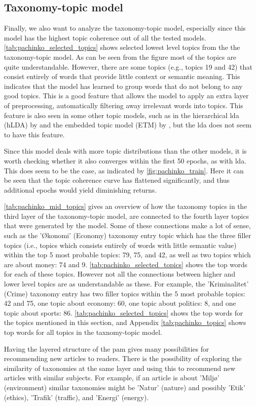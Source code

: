 \subsection{Taxonomy-topic model}\label{sec:taxonomy_analysis}
Finally, we also want to analyze the taxonomy-topic model, especially since this model has the highest topic coherence out of all the tested models.
\autoref{tab:pachinko_selected_topics} shows selected lowest level topics from the the taxonomy-topic model.
As can be seen from the figure most of the topics are quite understandable.
However, there are some topics (e.g., topics 19 and 42) that consist entirely of words that provide little context or semantic meaning.
This indicates that the model has learned to group words that do not belong to any good topics.
This is a good feature that allows the model to apply an extra layer of preprocessing, automatically filtering away irrelevant words into topics.
This feature is also seen in some other topic models, such as in the hierarchical \gls{lda} (hLDA) by \citet{hLDA2004} and the embedded topic model (ETM) by \citet{dieng2020topic}, but the \gls{lda} does not seem to have this feature.

Since this model deals with more topic distributions than the other models, it is worth checking whether it also converges within the first 50 epochs, as with \gls{lda}.
This does seem to be the case, as indicated by \autoref{fig:pachinko_train}.
Here it can be seen that the topic coherence curve has flattened significantly, and thus additional epochs would yield diminishing returns.

\autoref{tab:pachinko_mid_topics} gives an overview of how the taxonomy topics in the third layer of the taxonomy-topic model, are connected to the fourth layer topics that were generated by the model.
Some of these connections make a lot of sense, such as the 'Økonomi' (Economy) taxonomy entry topic which has the three filler topics (i.e., topics which consists entirely of words with little semantic value) within the top 5 most probable topics: 79, 75, and 42, as well as two topics which are about money: 74 and 9.
\autoref{tab:pachinko_selected_topics} shows the top words for each of these topics.
However not all the connections between higher and lower level topics are as understandable as these. 
For example, the 'Kriminalitet' (Crime) taxonomy entry has two filler topics within the 5 most probable topics: 42 and 75, one topic about economy: 60, one topic about politics: 8, and one topic about sports: 86.
\autoref{tab:pachinko_selected_topics} shows the top words for the topics mentioned in this section, and Appendix \autoref{tab:pachinko_topics} shows top words for all topics in the taxnomy-topic model.

Having the layered structure of the \gls{pam} gives many possibilities for recommending new articles to readers.
There is the possibility of exploring the similarity of taxonomies at the same layer and using this to recommend new articles with similar subjects.
For example, if an article is about 'Miljø' (environment) similar taxonomies might be 'Natur' (nature) and possibly 'Etik' (ethics), 'Trafik' (traffic), and 'Energi' (energy).
